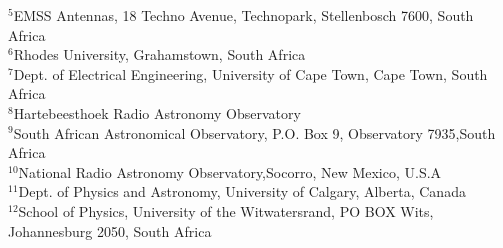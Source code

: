 {$^5$EMSS Antennas, 18 Techno Avenue, Technopark, Stellenbosch 7600, South Africa\\
$^6$Rhodes University, Grahamstown, South Africa\\
$^7$Dept. of Electrical Engineering, University of Cape Town, Cape Town, South Africa\\
$^8$Hartebeesthoek Radio Astronomy Observatory\\
$^9$South African Astronomical Observatory, P.O. Box 9, Observatory 7935,South Africa\\
$^{10}$National Radio Astronomy Observatory,Socorro, New Mexico, U.S.A\\
$^{11}$Dept. of Physics and Astronomy, University of Calgary, Alberta, Canada\\
$^{12}$School of Physics, University of the Witwatersrand, PO BOX Wits, Johannesburg 2050, South Africa
}
